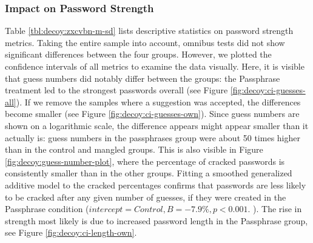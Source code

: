 \subsubsection{Impact on Password Strength}
Table \ref{tbl:decoy:zxcvbn-m-sd} lists descriptive statistics on password strength metrics. Taking the entire sample into account, omnibus tests did not show significant differences between the four groups. However, we plotted the confidence intervals of all metrics to examine the data visually. Here, it is visible that guess numbers did notably differ between the groups: the Passphrase treatment led to the strongest passwords overall (see Figure \ref{fig:decoy:ci-guesses-all}). If we remove the samples where a suggestion was accepted, the differences become smaller (see Figure \ref{fig:decoy:ci-guesses-own}). Since guess numbers are shown on a logarithmic scale, the difference appears might appear smaller than it actually is: guess numbers in the passphrases group were about 50 times higher than in the control and mangled groups. This is also visible in Figure \ref{fig:decoy:guess-number-plot}, where the percentage of cracked passwords is consistently smaller than in the other groups. Fitting a smoothed generalized additive model to the cracked percentages confirms that passwords are less likely to be cracked after any given number of guesses, if they were created in the Passphrase condition ($intercept=Control,B=-7.9\%, p<0.001$. ). The rise in strength most likely is due to increased password length in the Passphrase group, see Figure \ref{fig:decoy:ci-length-own}.





